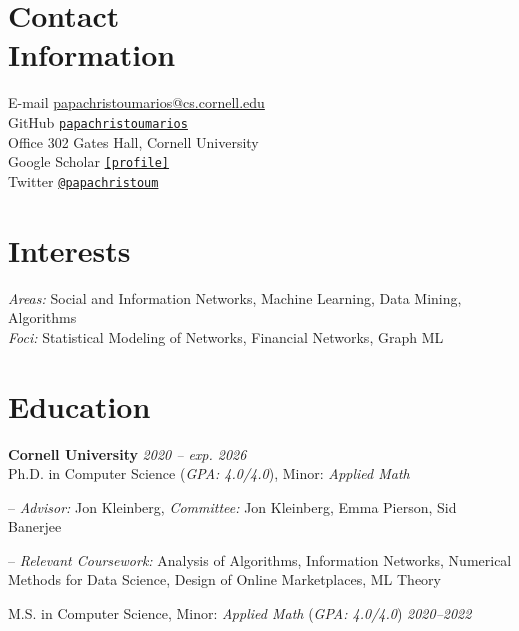 \documentclass[margin]{res}
\newcommand{\field}[2]{\noindent \textbf{#1} \hfill #2 \\}
\newcommand{\specialurl}[2]{\href {#2} {\texttt{[#1]}}}
\begin{document}

\begin{resume}

\section{Contact \\ Information} 
E-mail \hfill \url{papachristoumarios@cs.cornell.edu} \\
GitHub \hfill \href{http://github.com/papachristoumarios}{\nolinkurl{papachristoumarios}} \\
Office \hfill 302 Gates Hall, Cornell University \\
Google Scholar \hfill \specialurl{profile}{https://scholar.google.gr/citations?user=T12JO3MAAAAJ&hl=en} \\
Twitter \hfill \href{https://twitter.com/papachristoum}{\nolinkurl {@papachristoum}}


\section{Interests} \emph{Areas:} Social and Information Networks, Machine Learning, Data Mining, Algorithms \\
\emph{Foci:} Statistical Modeling of Networks, Financial Networks, Graph ML 

\section{Education}
\field {Cornell University} {\emph{2020 -- exp. 2026}}
Ph.D. in Computer Science (\emph{GPA: 4.0/4.0}), Minor: \emph{Applied Math}
\begin{compactitem}
\item[--] \emph{Advisor:} Jon Kleinberg, \emph{Committee:} Jon Kleinberg, Emma Pierson, Sid Banerjee 
\item[--] \emph{Relevant Coursework:} Analysis of Algorithms, Information Networks, Numerical Methods for Data Science, Design of Online Marketplaces, ML Theory
\end{compactitem} 

M.S. in Computer Science, Minor: \emph{Applied Math} (\emph{GPA: 4.0/4.0}) \hfill {\emph{2020--2022}}
 

\end{resume}
\end{document}
